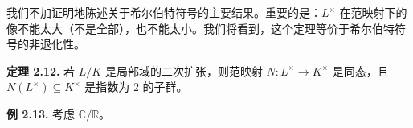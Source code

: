 我们不加证明地陈述关于希尔伯特符号的主要结果。重要的是：$L^{\times}$ 在范映射下的像不能太大（不是全部），也不能太小。我们将看到，这个定理等价于希尔伯特符号的非退化性。

\textbf{定理 2.12.} 若 $L/K$ 是局部域的二次扩张，则范映射 $N\colon L^{\times}\to K^{\times}$ 是同态，且 $N(L^{\times})\subseteq K^{\times}$ 是指数为 $2$ 的子群。

\textbf{例 2.13.} 考虑 $\mathbb{C}/\mathbb{R}$。
